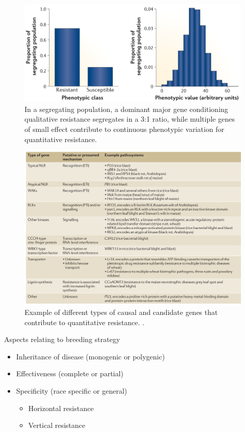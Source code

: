 \documentclass[11pt,dvipsnames,ignorenonframetext,aspectratio=169]{beamer}
\providecommand{\tightlist}{%
  \setlength{\itemsep}{0pt}\setlength{\parskip}{0pt}}
\begin{document}
\begin{frame}{}
\protect\hypertarget{section-24}{}
\begin{figure}
\includegraphics[width=0.99\linewidth]{../images/qualitative_quantitative_segregation} \caption{In a segregating population, a dominant major gene conditioning qualitative resistance segregates in a 3:1 ratio, while multiple genes of small effect contribute to continuous phenotypic variation for quantitative resistance.}\label{fig:quantitative-qualitative-segregation}
\end{figure}
\end{frame}

\begin{frame}{}
\protect\hypertarget{section-25}{}
\begin{figure}
\includegraphics[width=0.7\linewidth]{../images/quantitative_candidate} \caption{Example of different types of causal and candidate genes that contribute to quantitative resistance. \cite{nelson2018navigating}.}\label{fig:quantitative-candidate-genes}
\end{figure}
\end{frame}

\begin{frame}{Aspects relating to breeding strategy}
\protect\hypertarget{aspects-relating-to-breeding-strategy}{}
\begin{itemize}
\tightlist
\item
  Inheritance of disease (monogenic or polygenic)
\item
  Effectiveness (complete or partial)
\item
  Specificity (race specific or general)

  \begin{itemize}
  \tightlist
  \item
    Horizontal resistance
  \item
    Vertical resistance
  \end{itemize}
\end{itemize}
\end{frame}
\end{document}
